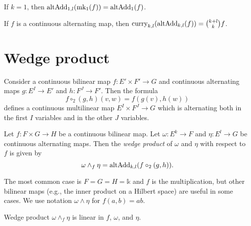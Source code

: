 \begin{theorem}%
  \label{thm:uncurry-fin-add-one}
  If \(k = 1\), then \(\operatorname{altAdd}_{1, l}(\operatorname{mk_1}(f)) = \operatorname{altAdd}_{1}(f)\).
\end{theorem}

\begin{theorem}%
  \label{thm:curry-uncurry-fin-add}
  If \(f\) is a continuous alternating map, then \(\operatorname{curry}_{k, l}(\operatorname{altAdd}_{k, l}(f)) = \binom{k + l}{k}f\).
\end{theorem}

\section{Wedge product}%
\label{sec:wedge-product}

\begin{definition}
  Consider a continuous bilinear map \(f \colon E' \times F' \to G\)
  and continuous alternating maps \(g\colon E^{I}\to E'\) and \(h\colon F^{J}\to F'\).
  Then the formula
  \[
    f \circ_{2} (g, h)(v, w) = f(g(v), h(w))
  \]
  defines a continuous multilinear map \(E^{I}\times F^{J}\to G\)
  which is alternating both in the first \(I\) variables and in the other \(J\) variables.
\end{definition}

\begin{definition}
  Let \(f \colon F \times G \to H\) be a continuous bilinear map.
  Let \(\omega \colon E^{k} \to F\) and \(\eta\colon E^{l}\to G\) be continuous alternating maps.
  Then the \emph{wedge product} of \(\omega\) and \(\eta\) with respect to \(f\) is given by
  \[
    \omega \wedge_{f} \eta = \operatorname{altAdd}_{k, l}(f \circ_{2}(g, h)).
  \]
\end{definition}

The most common case is \(F = G = H = \mathbb k\) and \(f\) is the multiplication,
but other bilinear maps (e.g., the inner product on a Hilbert space) are useful in some cases.
We use notation \(\omega \wedge \eta\) for \(f(a, b) = ab\).


\begin{theorem}
  Wedge product \(\omega \wedge_{f} \eta\) is linear in \(f\), \(\omega\), and \(\eta\).
\end{theorem}

